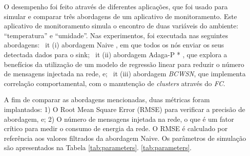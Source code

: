\documentclass{acm_proc_article-sp}
\begin{document}
O desempenho foi feito através de diferentes aplicações, que foi usado
para simular e comparar três abordagens de um aplicativo de monitoramento. 
Este aplicativo de monitoramento simula o encontro de duas variáveis
do ambiente: ``temperatura'' e ``umidade''.
Nas experimentos, foi executada nas seguintes abordagens: {\ it 
 (i)} abordagem Naive \cite {Madden2005}, em que todos os nós enviar
os seus detectada dados para o sink; {\ it 
 (ii)} abordagem Adaga-P * \cite {MaiaACR2013}, que explora a 
benefícios da utilização de um modelo de regressão linear para 
reduzir o número de mensagens injectada na rede, e; {\ it 
 (iii)} abordagem {\it BCWSN}, que implementa correlação comportamental, com o 
 manutenção de {\it clusters} através do \textit{FC}.
\vspace*{-.3cm}

A fim de comparar as abordagens mencionadas, duas métricas foram implantados:
1) O Root Mean Square Error (RMSE) para verificar a precisão de abordagem,
e; 2) O número de mensagens injetada na rede, o que é um fator crítico 
para medir o consumo de energia da rede. O RMSE é calculado por referência
aos valores filtrados da abordagem Naive. Os parâmetros de simulação são
apresentados na Tabela \ref{tab:parameters}.
\ref{tab:parameters}.
\end{document}
